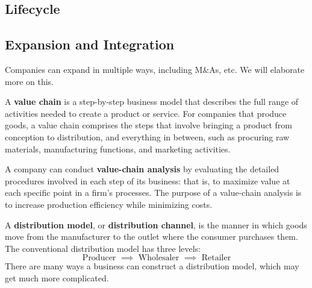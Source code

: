 \documentclass{article}
\begin{document}
    \begin{definition}
      \label{def:information-technology-it}
      
    \end{definition}

    \begin{definition}
      \label{def:research-and-development-r-d}
      
    \end{definition}

    \begin{definition}[Operations]
      \label{def:operations}
      
    \end{definition}

  \subsection{Lifecycle}


  \subsection{Expansion and Integration}

    Companies can expand in multiple ways, including M\&As, etc. We will elaborate more on this. 

    \begin{definition}
      \label{def:value-chain}
      A \textbf{value chain} is a step-by-step business model that describes the full range of activities needed to create a product or service. For companies that produce goods, a value chain comprises the steps that involve bringing a product from conception to distribution, and everything in between, such as procuring raw materials, manufacturing functions, and marketing activities. 

      A company can conduct \textbf{value-chain analysis} by evaluating the detailed procedures involved in each step of its business: that is, to maximize value at each specific point in a firm's processes. The purpose of a value-chain analysis is to increase production efficiency while minimizing costs. 
    \end{definition}

    \begin{definition}
      \label{def:distribution-model}
      A \textbf{distribution model}, or \textbf{distribution channel}, is the manner in which goods move from the manufacturer to the outlet where the consumer purchases them. The conventional distribution model has three levels:
      \begin{equation}
        \text{Producer } \implies \text{ Wholesaler } \implies \text{ Retailer}
      \end{equation}
      There are many ways a business can construct a distribution model, which may get much more complicated. 
    \end{definition}
\end{document}
